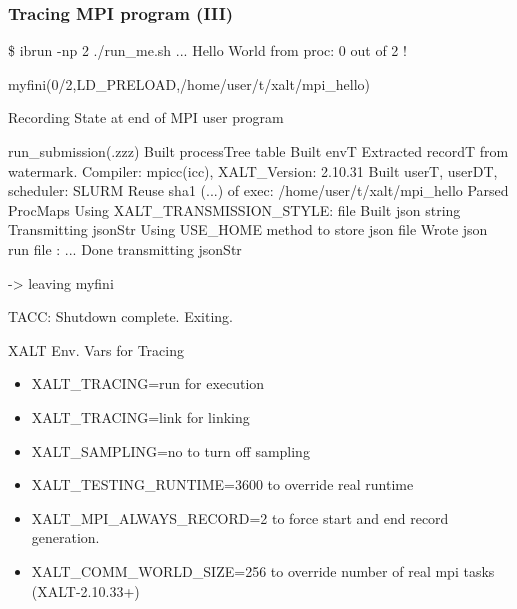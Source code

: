 \documentclass{beamer}
\begin{document}
\begin{frame}[fragile]
    \frametitle{Tracing MPI program (III)}
 {\tiny
    \begin{semiverbatim}
\$ ibrun -np 2 ./run\_me.sh
...
Hello World from proc: 0 out of 2 !

myfini(0/2,LD\_PRELOAD,/home/user/t/xalt/mpi\_hello){
  Recording State at end of MPI user program

  run\_submission(.zzz) {
    Built processTree table
    Built envT
    Extracted recordT from watermark. Compiler: mpicc(icc), XALT\_Version: 2.10.31
    Built userT, userDT, scheduler: SLURM
    Reuse   sha1 (...) of exec: /home/user/t/xalt/mpi\_hello
    Parsed ProcMaps
    Using XALT\_TRANSMISSION\_STYLE: file
    Built json string
    Transmitting jsonStr
    Using USE\_HOME method to store json file
    Wrote json run file : ...
    Done transmitting jsonStr
  }

    -> leaving myfini
}

TACC:  Shutdown complete. Exiting. 
\end{semiverbatim}
}
\end{frame}


\begin{frame}{XALT Env. Vars for Tracing}
  \begin{itemize}
    \item XALT\_TRACING=run for execution
    \item XALT\_TRACING=link for linking
    \item XALT\_SAMPLING=no to turn off sampling
    \item XALT\_TESTING\_RUNTIME=3600 to override real runtime
    \item XALT\_MPI\_ALWAYS\_RECORD=2 to force start and end record generation.
    \item XALT\_COMM\_WORLD\_SIZE=256 to override number of real mpi tasks
      (XALT-2.10.33+)
  \end{itemize}
\end{frame}

%
%

%
\end{document}
